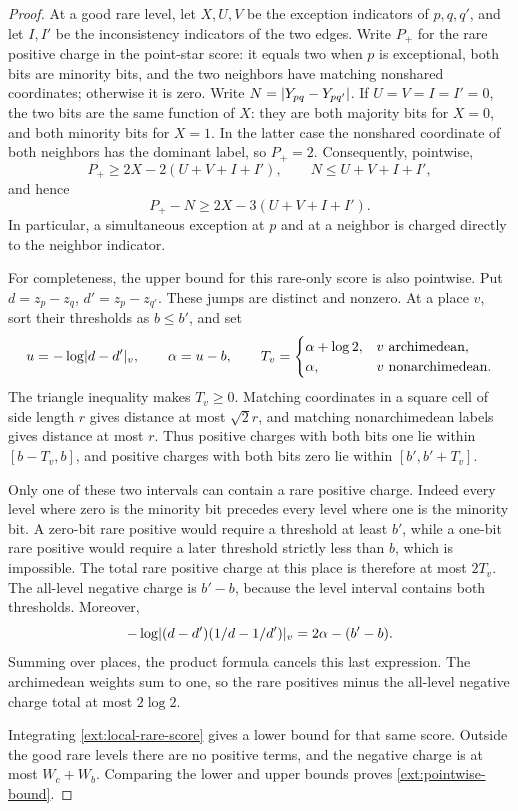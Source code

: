 \begin{proof}
At a good rare level, let \(X,U,V\) be the exception indicators of
\(p,q,q'\), and let \(I,I'\) be the inconsistency indicators of the two
edges.  Write \(P_+\) for the rare positive charge in the point-star score:
it equals two when \(p\) is exceptional, both bits are minority bits, and
the two neighbors have matching nonshared coordinates; otherwise it is
zero.  Write \(N=\lvert Y_{pq}-Y_{pq'}\rvert\).
If \(U=V=I=I'=0\), the two bits are the same function of \(X\): they are
both majority bits for \(X=0\), and both minority bits for \(X=1\).
In the latter case the nonshared coordinate of both neighbors has the
dominant label, so \(P_+=2\).  Consequently, pointwise,
\[
 P_+\ge 2X-2(U+V+I+I'),\qquad
 N\le U+V+I+I',
\]
and hence
\begin{equation}\label{ext:local-rare-score}
 P_+-N\ge 2X-3(U+V+I+I').
\end{equation}
In particular, a simultaneous exception at \(p\) and at a neighbor is
charged directly to the neighbor indicator.

For completeness, the upper bound for this rare-only score is also
pointwise.  Put \(d=z_p-z_q\), \(d'=z_p-z_{q'}\).  These jumps are distinct
and nonzero.  At a place \(v\), sort their thresholds as \(b\le b'\), and set
\[
 u=-\log\lvert d-d'\rvert_v,\qquad \alpha=u-b,\qquad
 T_v=\begin{cases}\alpha+\log 2,&v\text{ archimedean},\\
                    \alpha,&v\text{ nonarchimedean}.
       \end{cases}
\]
The triangle inequality makes \(T_v\ge0\).  Matching coordinates in a
square cell of side length \(r\) gives distance at most \(\sqrt2 r\), and
matching nonarchimedean labels gives distance at most \(r\).
Thus positive charges with both bits one lie within \([b-T_v,b]\), and
positive charges with both bits zero lie within \([b',b'+T_v]\).

Only one of these two intervals can contain a rare positive charge.
Indeed every level where zero is the minority bit precedes every level
where one is the minority bit.  A zero-bit rare positive would require a
threshold at least \(b'\), while a one-bit rare positive would require a
later threshold strictly less than \(b\), which is impossible.
The total rare positive charge at this place is therefore at most
\(2T_v\).  The all-level negative charge is \(b'-b\), because the level
interval contains both thresholds.  Moreover,
\[
 -\log\lvert (d-d')(1/d-1/d')\rvert_v=2\alpha-(b'-b).
\]
Summing over places, the product formula cancels this last expression.
The archimedean weights sum to one, so the rare positives minus the
all-level negative charge total at most \(2\log2\).

Integrating \eqref{ext:local-rare-score} gives a lower bound for that same
score.  Outside the good rare levels there are no positive terms, and
the negative charge is at most \(W_c+W_b\).  Comparing the lower and upper
bounds proves \eqref{ext:pointwise-bound}.
\end{proof}

